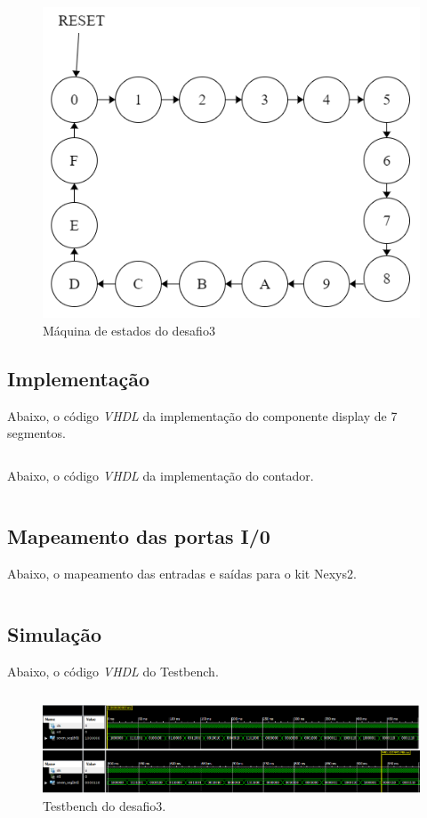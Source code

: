 \documentclass[12pt]{article}
\begin{document}
\begin{figure}[!h]
    \centering
    \includegraphics[width=1.0\textwidth]{fsm3.png}
    \caption{Máquina de estados do desafio3}
\end{figure}

\subsection{Implementação}

Abaixo, o código \emph{VHDL} da implementação do componente display de 7 segmentos.

\inputminted{vhdl}{display7seg.vhd}

Abaixo, o código \emph{VHDL} da implementação do contador.

\inputminted{vhdl}{desafio3.vhd}

\subsection{Mapeamento das portas I/0}

Abaixo, o mapeamento das entradas e saídas para o kit Nexys2.

\inputminted{vhdl}{desafio3_pins.ucf}

\subsection{Simulação}

Abaixo, o código \emph{VHDL} do Testbench.

\inputminted{vhdl}{des3_tb.vhd}

\begin{figure}[!h]
    \centering
    \includegraphics[width=1.0\textwidth]{desafio3_tb.png}
    \caption{Testbench do desafio3.}
\end{figure}
\end{document}
